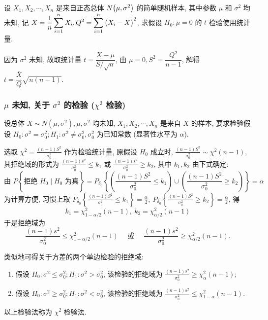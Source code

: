 \begin{example}[1995 数三]
    设 $X_1, X_2, \cdots , X_n$ 是来自正态总体 $N\qty(\mu,\sigma^2)$ 的简单随机样本, 其中参数 $\mu$ 和 $\sigma^2$ 均未知, 记 $\bar{X}=\displaystyle \dfrac{1}{n}\sum_{i=1}^{n} X_i, Q^2=\sum_{i=1}^{n} \qty(X_i-\bar{X})^2$, 求假设 $H_0:\mu=0$ 的 $t$ 检验使用统计量.
\end{example}
\begin{solution}
    因为 $\sigma^2$ 未知, 故取统计量 $t=\dfrac{\bar{X}-\mu}{S/\sqrt{n}}$, 由 $\mu=0, S^2=\dfrac{Q^2}{n-1}$, 解得 $t=\dfrac{\bar{X}}{Q}\sqrt{n(n-1)}.$
\end{solution}

\subsubsection{\texorpdfstring{$\mu$}. 未知, 关于 \texorpdfstring{$\sigma^2$}. 的检验 (\texorpdfstring{$\chi^2$}. 检验)}

设总体 $ X \sim N\left(\mu, \sigma^{2}\right), \mu, \sigma^{2} $ 均未知, $X_{1}, X_{2}, \cdots, X_{n} $ 是来自 $ X $ 的样本, 要求检验假设 $ H_{0}: \sigma^{2}=\sigma_{0}^{2} ; H_{1}: \sigma^{2} \neq \sigma_{0}^{2}, \sigma_{0}^{2} $ 为已知常数 (显著性水平为 $ \alpha $).

选取 $\displaystyle \chi^{2}=\frac{(n-1) S^{2}}{\sigma_{0}^{2}} $ 作为检验统计量, 原假设 $ H_{0} $ 成立时, $\displaystyle \frac{(n-1) S^{2}}{\sigma_{0}^{2}} \sim \chi^{2}(n-1)$, 其拒绝域的形式为 $\displaystyle \frac{(n-1) s^{2}}{\sigma_{0}^{2}} \leqslant k_{1} $ 或 $\displaystyle \frac{(n-1) s^{2}}{\sigma_{0}^{2}} \geqslant k_{2} $, 其中 $ k_{1}, k_{2} $ 由下式确定:
$$\text{由 }  P\left\{ \right. \text{拒绝 }  H_{0} \mid H_{0} \left.  \text{ 为真}  \right\}=P_{\delta_{0}}\left\{\left(\frac{(n-1) S^{2}}{\sigma_{0}^{2}} \leqslant k_{1}\right) \cup\left(\frac{(n-1) S^{2}}{\sigma_{0}^{2}} \geqslant k_{2}\right)\right\}=\alpha$$
为计算方便, 习惯上取 $\displaystyle P_{\delta_{0}}\left\{\frac{(n-1) S^{2}}{\sigma_{0}^{2}} \leqslant k_{1}\right\}=\frac{\alpha}{2},~ P_{\delta_0}\left\{\frac{(n-1) S^{2}}{\sigma_{0}^{2}} \geqslant k_{2}\right\}=\frac{\alpha}{2} $, 得 $$ k_{1}=\chi_{1-\alpha / 2}^{2}(n-1) ,~  k_{2}=\chi_{\alpha / 2}^{2}(n-1) $$
于是拒绝域为
$$\frac{(n-1) s^{2}}{\sigma_{0}^{2}} \leqslant \chi_{1-\alpha / 2}^{2}(n-1) \quad \text { 或 } \quad \frac{(n-1) s^{2}}{\sigma_{0}^{2}} \geqslant \chi_{\alpha / 2}^{2}(n-1) .$$

类似地可得关于方差的两个单边检验的拒绝域:

\begin{enumerate}[label=(\arabic{*})]
    \item 假设 $ H_{0}: \sigma^{2} \leqslant \sigma_{0}^{2} ; H_{1}: \sigma^{2}>\sigma_{0}^{2} $, 该检验的拒绝域为 $\displaystyle \frac{(n-1) s^{2}}{\sigma_{0}^{2}} \geqslant \chi_{\alpha}^{2}(n-1) $;
    \item 假设 $ H_{0}: \sigma^{2} \geqslant \sigma_{0}^{2} ; H_{1}: \sigma^{2}<\sigma_{0}^{2} $, 该检验的拒绝域为 $\displaystyle \frac{(n-1) s^{2}}{\sigma_{0}^{2}} \leqslant \chi_{1-\alpha}^{2}(n-1) $.
\end{enumerate}
以上检验法称为 $ \chi^{2} $ 检验法.


